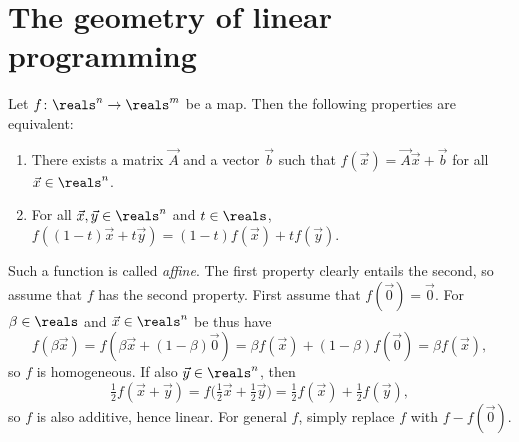 \documentclass[article, a4paper, 11pt, oneside]{memoir}
\title{\doctitle}
\author{\docauthor}
\numberwithin{equation}{chapter}
\theoremstyle{nonumberplain}
\begin{document}
\maketitle

\addtocounter{chapter}{1}
\chapter{The geometry of linear programming}

\newcommand{\keyword}[1]{{\bfseries \textit{#1}}}
\newcommand{\mat}{\vec}


\begin{remark}
    Let $f \colon \reals^n \to \reals^m$ be a map. Then the following properties are equivalent:
    \begin{enumerate}
        \item There exists a matrix $\mat{A}$ and a vector $\vec{b}$ such that $f(\vec{x}) = \mat{A}\vec{x} + \vec{b}$ for all $\vec{x} \in \reals^n$.
        \item For all $\vec{x},\vec{y} \in \reals^n$ and $t \in \reals$, $f((1-t)\vec{x} + t\vec{y}) = (1-t)f(\vec{x}) + tf(\vec{y})$.
    \end{enumerate}
    Such a function is called \emph{affine}. The first property clearly entails the second, so assume that $f$ has the second property. First assume that $f(\vec{0}) = \vec{0}$. For $\beta \in \reals$ and $\vec{x} \in \reals^n$ be thus have
    \begin{equation*}
        f(\beta \vec{x})
            = f(\beta \vec{x} + (1-\beta)\vec{0})
            = \beta f(\vec{x}) + (1-\beta)f(\vec{0})
            = \beta f(\vec{x}),
    \end{equation*}
    so $f$ is homogeneous. If also $\vec{y} \in \reals^n$, then
    \begin{equation*}
        \tfrac{1}{2} f(\vec{x} + \vec{y})
            = f \bigl( \tfrac{1}{2} \vec{x} + \tfrac{1}{2} \vec{y} \bigr)
            = \tfrac{1}{2} f(\vec{x}) + \tfrac{1}{2} f(\vec{y}),
    \end{equation*}
    so $f$ is also additive, hence linear. For general $f$, simply replace $f$ with $f - f(\vec{0})$.
\end{remark}
\end{document}
